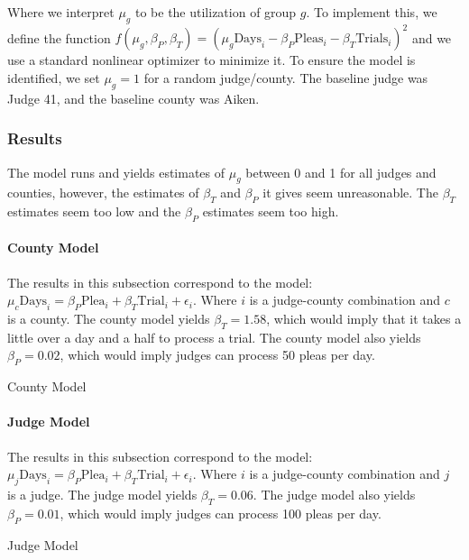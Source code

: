 \documentclass[11pt, oneside]{article}   	%
\theoremstyle{ModifiedStyle}
\begin{document}
		Where we interpret $\mu_g$ to be the utilization of group $g$. To implement this, we define the function $f(\mu_g,\beta_P,\beta_T) = (\mu_g \text{Days}_i - \beta_P \text{Pleas}_i - \beta_T \text{Trials}_i)^2$ and we use a standard nonlinear optimizer to minimize it. To ensure the model is identified, we set $\mu_g=1$ for a random judge/county. The baseline judge was Judge 41, and the baseline county was Aiken.

		\subsubsection{Results}
		  The model runs and yields estimates of $\mu_g$ between 0 and 1 for all judges and counties, however, the estimates of $\beta_T$ and $\beta_P$ it gives seem unreasonable. The $\beta_T$ estimates seem too low and the $\beta_P$ estimates seem too high.

		  \paragraph{County Model}
		    The results in this subsection correspond to the model: $\mu_c \text{Days}_i = \beta_P \text{Plea}_i + \beta_T \text{Trial}_i + \epsilon_i$. Where $i$ is a judge-county combination and $c$ is a county. The county model yields $\beta_T=1.58$, which would imply that it takes a little over a day and a half to process a trial. The county model also yields $\beta_P=0.02$, which would imply judges can process 50 pleas per day.

		    \begin{table}[H]
		      \centering
		      \caption{County Model}
		      
		    \end{table}

		  \paragraph{Judge Model}
		    The results in this subsection correspond to the model: $\mu_j \text{Days}_i = \beta_P \text{Plea}_i + \beta_T \text{Trial}_i + \epsilon_i$. Where $i$ is a judge-county combination and $j$ is a judge. The judge model yields $\beta_T=0.06$. The judge model also yields $\beta_P=0.01$, which would imply judges can process 100 pleas per day.

		    \begin{table}[H]
		      \centering
		      \small
		      \caption{Judge Model}
		      
		    \end{table}
\end{document}
